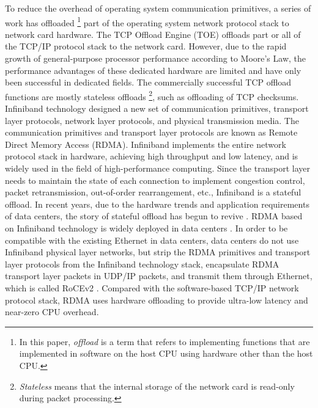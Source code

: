 To reduce the overhead of operating system communication primitives, a series of work has offloaded \footnote{In this paper, \textit{offload} is a term that refers to implementing functions that are implemented in software on the host CPU using hardware other than the host CPU.} part of the operating system network protocol stack to network card hardware. The TCP Offload Engine (TOE) \cite{tcp-chimney-offload} offloads part or all of the TCP/IP protocol stack to the network card. However, due to the rapid growth of general-purpose processor performance according to Moore's Law, the performance advantages of these dedicated hardware are limited and have only been successful in dedicated fields. The commercially successful TCP offload functions are mostly stateless offloads \footnote{\textit{Stateless} means that the internal storage of the network card is read-only during packet processing.}, such as offloading of TCP checksums. Infiniband \cite{infiniband2000infiniband} technology designed a new set of communication primitives, transport layer protocols, network layer protocols, and physical transmission media. The communication primitives and transport layer protocols are known as Remote Direct Memory Access (RDMA). Infiniband implements the entire network protocol stack in hardware, achieving high throughput and low latency, and is widely used in the field of high-performance computing. Since the transport layer needs to maintain the state of each connection to implement congestion control, packet retransmission, out-of-order rearrangement, etc., Infiniband is a stateful offload. In recent years, due to the hardware trends and application requirements of data centers, the story of stateful offload has begun to revive \cite{chuanxiong-rdma-keynote}. RDMA based on Infiniband technology is widely deployed in data centers \cite{guo2016rdma}. In order to be compatible with the existing Ethernet in data centers, data centers do not use Infiniband physical layer networks, but strip the RDMA primitives and transport layer protocols from the Infiniband technology stack, encapsulate RDMA transport layer packets in UDP/IP packets, and transmit them through Ethernet, which is called RoCEv2 \cite{rocev2}. Compared with the software-based TCP/IP network protocol stack, RDMA uses hardware offloading to provide ultra-low latency and near-zero CPU overhead.

